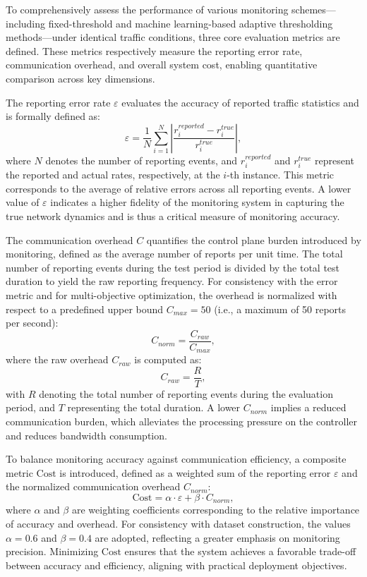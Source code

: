 \noindent To comprehensively assess the performance of various monitoring schemes---including fixed-threshold and machine learning-based adaptive thresholding methods---under identical traffic conditions, three core evaluation metrics are defined. 
These metrics respectively measure the reporting error rate, communication overhead, and overall system cost, enabling quantitative comparison across key dimensions.

The reporting error rate $\varepsilon$ evaluates the accuracy of reported traffic statistics and is formally defined as:
\begin{equation}
    \varepsilon = \frac{1}{N} \sum_{i=1}^{N} \left| \frac{r_{i}^{reported} - r_{i}^{true}}{r_{i}^{true}} \right|,
\end{equation}
where $N$ denotes the number of reporting events, and $r_{i}^{reported}$ and $r_{i}^{true}$ represent the reported and actual rates, respectively, at the $i$-th instance. 
This metric corresponds to the average of relative errors across all reporting events. 
A lower value of $\varepsilon$ indicates a higher fidelity of the monitoring system in capturing the true network dynamics and is thus a critical measure of monitoring accuracy.

The communication overhead $C$ quantifies the control plane burden introduced by monitoring, defined as the average number of reports per unit time. 
The total number of reporting events during the test period is divided by the total test duration to yield the raw reporting frequency. 
For consistency with the error metric and for multi-objective optimization, the overhead is normalized with respect to a predefined upper bound $C_{max}=50$ (i.e., a maximum of 50 reports per second):
\begin{equation}
    C_{norm} = \frac{C_{raw}}{C_{max}},
\end{equation}
where the raw overhead $C_{raw}$ is computed as:
\begin{equation}
    C_{raw} = \frac{R}{T},
\end{equation}
with $R$ denoting the total number of reporting events during the evaluation period, and $T$ representing the total duration. 
A lower $C_{norm}$ implies a reduced communication burden, which alleviates the processing pressure on the controller and reduces bandwidth consumption.

To balance monitoring accuracy against communication efficiency, a composite metric $\text{Cost}$ is introduced, defined as a weighted sum of the reporting error $\varepsilon$ and the normalized communication overhead $C_{norm}$:
\begin{equation}
    \text{Cost} = \alpha \cdot \varepsilon + \beta \cdot C_{norm},
\end{equation}
where $\alpha$ and $\beta$ are weighting coefficients corresponding to the relative importance of accuracy and overhead.
For consistency with dataset construction, the values $\alpha = 0.6$ and $\beta = 0.4$ are adopted, reflecting a greater emphasis on monitoring precision. 
Minimizing $\text{Cost}$ ensures that the system achieves a favorable trade-off between accuracy and efficiency, aligning with practical deployment objectives.


